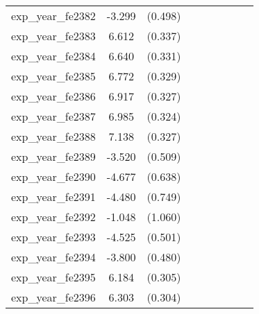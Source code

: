 {\begin{tabular}{l*{4}{cc}}
exp\_year\_fe2382&   -3.299\sym{***}&  (0.498)&                  &         &                  &         &                  &         \\
exp\_year\_fe2383&    6.612\sym{***}&  (0.337)&                  &         &                  &         &                  &         \\
exp\_year\_fe2384&    6.640\sym{***}&  (0.331)&                  &         &                  &         &                  &         \\
exp\_year\_fe2385&    6.772\sym{***}&  (0.329)&                  &         &                  &         &                  &         \\
exp\_year\_fe2386&    6.917\sym{***}&  (0.327)&                  &         &                  &         &                  &         \\
exp\_year\_fe2387&    6.985\sym{***}&  (0.324)&                  &         &                  &         &                  &         \\
exp\_year\_fe2388&    7.138\sym{***}&  (0.327)&                  &         &                  &         &                  &         \\
exp\_year\_fe2389&   -3.520\sym{***}&  (0.509)&                  &         &                  &         &                  &         \\
exp\_year\_fe2390&   -4.677\sym{***}&  (0.638)&                  &         &                  &         &                  &         \\
exp\_year\_fe2391&   -4.480\sym{***}&  (0.749)&                  &         &                  &         &                  &         \\
exp\_year\_fe2392&   -1.048         &  (1.060)&                  &         &                  &         &                  &         \\
exp\_year\_fe2393&   -4.525\sym{***}&  (0.501)&                  &         &                  &         &                  &         \\
exp\_year\_fe2394&   -3.800\sym{***}&  (0.480)&                  &         &                  &         &                  &         \\
exp\_year\_fe2395&    6.184\sym{***}&  (0.305)&                  &         &                  &         &                  &         \\
exp\_year\_fe2396&    6.303\sym{***}&  (0.304)&                  &         &                  &         &                  &         \\

\end{tabular}}
